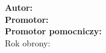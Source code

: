 \thispagestyle{empty}

\begin{center}
{\Large \CertifyingUnit} \\[1em]
{\Huge \ThesisTitle} \\[3em]
\textbf{Autor:} \AuthorName \\[2em]
\textbf{Promotor:} \SupervisorName \\[1em]
\textbf{Promotor pomocniczy:} \AuxSupervisorName \\[3em]
Rok obrony: \YearOfDefense
\end{center}

\newpage
